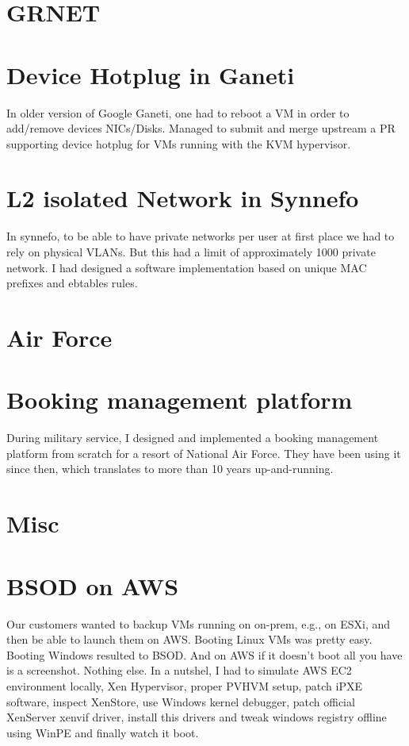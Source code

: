 \documentclass[margin,centered]{res}
\begin{document}
\begin{resume}
\section{GRNET}

\section{\sc Device Hotplug in Ganeti}
In older version of Google Ganeti, one had to reboot a VM in order to
add/remove devices NICs/Disks. Managed to submit and merge upstream a PR
supporting device hotplug for VMs running with the KVM hypervisor.

\section{\sc L2 isolated Network in Synnefo}
In synnefo, to be able to have private networks per user at first place we
had to rely on physical VLANs. But this had a limit of approximately 1000
private network. I had designed a software implementation based on unique MAC
prefixes and ebtables rules.

\section{Air Force}

\section{\sc Booking management platform}
During military service, I designed and implemented a booking management
platform from scratch for a resort of National Air Force. They have been using
it since then, which translates to more than 10 years up-and-running.

\section{Misc}

\section{\sc BSOD on AWS}
Our customers wanted to backup VMs running on on-prem, e.g., on ESXi, and then
be able to launch them on AWS. Booting Linux VMs was pretty easy. Booting
Windows resulted to BSOD. And on AWS if it doesn't boot all you have is a
screenshot. Nothing else. In a nutshel, I had to simulate AWS EC2 environment
locally, Xen Hypervisor, proper PVHVM setup, patch iPXE software, inspect
XenStore, use Windows kernel debugger, patch official XenServer xenvif driver,
install this drivers and tweak windows registry offline using WinPE and
finally watch it boot.


\end{resume}
\end{document}
